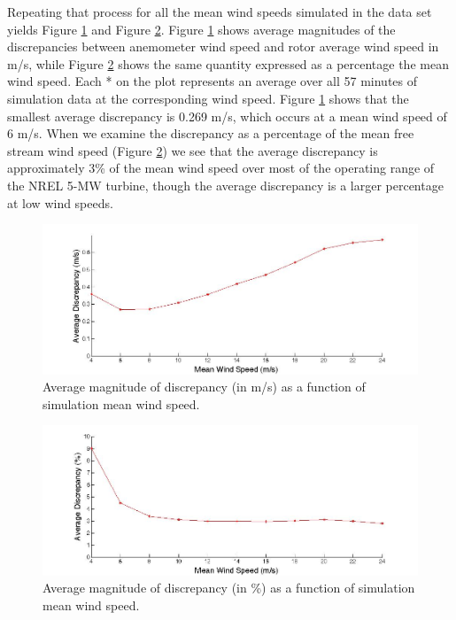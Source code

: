 Repeating that process for all the mean wind speeds simulated in the data set yields Figure \ref{fig2-11} and Figure \ref{fig2-12}. Figure \ref{fig2-11} shows average magnitudes of the discrepancies between anemometer wind speed and rotor average wind speed in m/s, while Figure \ref{fig2-12} shows the same quantity expressed as a percentage the mean wind speed. Each * on the plot represents an average over all 57 minutes of simulation data at the corresponding wind speed. Figure \ref{fig2-11} shows that the smallest average discrepancy is 0.269 m/s, which occurs at a mean wind speed of  6 m/s. When we examine the discrepancy as a percentage of the mean free stream wind speed  (Figure \ref{fig2-12}) we see that the average discrepancy is approximately 3\% of the mean wind speed over most of the operating range of the NREL 5-MW turbine, though the  average discrepancy is a larger percentage at low wind speeds.

\begin{figure}[htbp]
	\centering
		\includegraphics[width = \linewidth]{Figures/ch2Figures/fig2-11.jpg}
		
	\caption{Average magnitude of discrepancy (in m/s) as a function of simulation mean wind speed.}
	\label{fig2-11}
\end{figure}

\begin{figure}[htbp]
	\centering
		\includegraphics[width = \linewidth]{Figures/ch2Figures/fig2-12.jpg}
		
	\caption{Average magnitude of discrepancy (in \%) as a function of simulation mean wind speed.}
	\label{fig2-12}
\end{figure}



